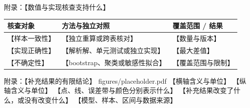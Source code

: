 \documentclass[aspectratio=169,11pt,fontset=fandol]{ctexbeamer}
\begin{document}
\begin{frame}{附录：【数值与实现核查支持什么】}
  \normalsize\setlength{\tabcolsep}{3pt}
  \begin{tabular}{@{}p{3.0cm} p{6.0cm} p{4.5cm}@{}}
    \toprule
    核查对象 & 方法与独立对照 & 覆盖范围 / 结果 \\
    \midrule
    【样本一致性】 & 【独立重算或跨表核对】 & 【数量与版本】 \\
    【实现正确性】 & 【解析解、单元测试或独立实现】 & 【最大差值】 \\
    【不确定性】 & 【bootstrap、聚类或敏感性拟合】 & 【覆盖范围与限制】 \\
    \bottomrule
  \end{tabular}
\end{frame}

\fullfigureslide
  {附录：【补充结果的有限结论】}
  {figures/placeholder.pdf}
  {【横轴含义与单位】}
  {【纵轴含义与单位】}
  {【点、线、误差带与颜色分别表示什么】}
  {【补充结果改变了什么，或没有改变什么】}
  {【模型、样本、区间与数据来源】}
\end{document}
